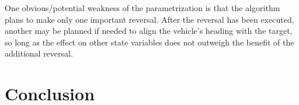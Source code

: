 \documentclass[letterpaper, preprint, paper,11pt]{AAS}
\begin{document}
One obvious/potential weakness of the parametrization is that the algorithm plans to make only one important reversal. After the reversal has been executed, another may be planned if needed to align the vehicle's heading with the target, so long as the effect on other state variables does not outweigh the benefit of the additional reversal. 

\section{Conclusion}



\end{document}
